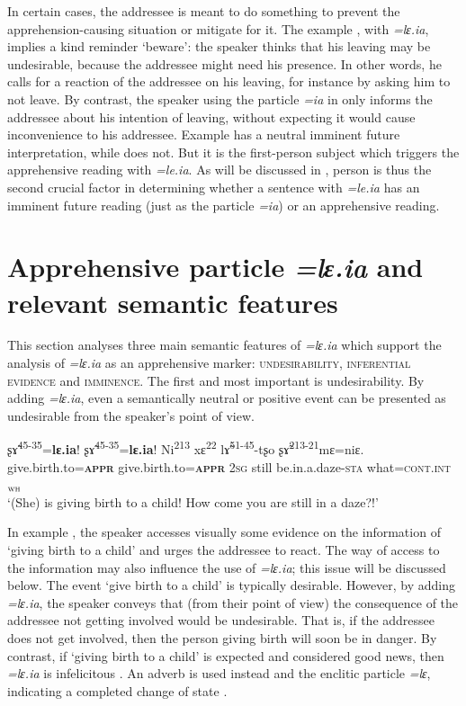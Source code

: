 \documentclass[output=paper,colorlinks,citecolor=brown, language=chinese]{langscibook}
\begin{document}
In certain cases, the addressee is meant to do something to prevent the apprehension\hyp causing situation or mitigate for it. The example , with \textit{=lɛ.ia}, implies a kind reminder `beware': the speaker thinks that his leaving may be undesirable, because the addressee might need his presence. In other words, he calls for a reaction of the addressee on his leaving, for instance by asking him to not leave. By contrast, the speaker using the particle \textit{=ia} in  only informs the addressee about his intention of leaving, without expecting it would cause inconvenience to his addressee. Example  has a neutral imminent future interpretation, while  does not. But it is the first-person subject which triggers the apprehensive reading with \textit{=le.ia}. As will be discussed in , person is thus the second crucial factor in determining whether a sentence with \textit{=le.ia} has an imminent future reading (just as the particle \textit{=ia}) or an apprehensive reading.


\section{Apprehensive particle \textit{=lɛ.ia} and relevant semantic features}
\label{sec:semanticsleia}

This section analyses three main semantic features of \textit{=lɛ.ia} which support the analysis of \textit{=lɛ.ia} as an apprehensive marker: \textsc{undesirability}, \textsc{inferential evidence} and \textsc{imminence}. The first and most important is undesirability. By adding \textit{=lɛ.ia}, even a semantically neutral or positive event can be presented as undesirable from the speaker's point of view.


\ea\label{ex:Song24}
\gll ʂ\~ɤ\textsuperscript{45-35}=\textbf{lɛ.ia}! ʂ\~ɤ\textsuperscript{45-35}=\textbf{lɛ.ia}! Ni\textsuperscript{213}	xɛ\textsuperscript{22} l\~ɤ\textsuperscript{51-45}-tʂo ʂɤ̃\textsuperscript{213-21}mɛ=niɛ. \\
give.birth.to=\textsc{\textbf{appr}} give.birth.to=\textsc{\textbf{appr}} \textsc{2sg} still be.in.a.daze-\textsc{sta} what=\textsc{cont.int$_{\textsc{wh}}$}\\
\glt `(She) is giving birth to a child! How come you are  still in a daze?!'
\z

 In example , the speaker accesses visually some evidence on the information of `giving birth to a child' and urges the addressee to react. The way of access to the information may also influence the use of \textit{=lɛ.ia}; this issue will be discussed below. The event `give birth to a child' is typically desirable. However, by adding \textit{=lɛ.ia}, the speaker conveys that (from their point of view) the consequence of the addressee not getting involved would be undesirable. That is, if the addressee does not get involved, then the person giving birth will soon be in danger. By contrast, if `giving birth to a child' is expected and considered good news, then \textit{=lɛ.ia} is infelicitous . An adverb is used instead and the enclitic particle \textit{=lɛ}, indicating a completed change of state .
\end{document}
